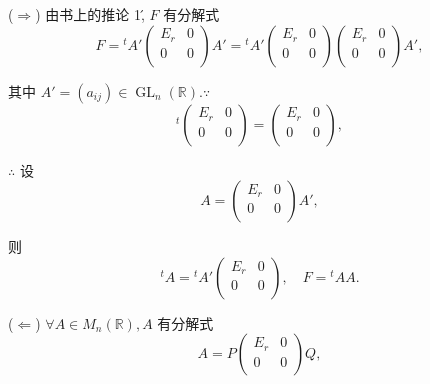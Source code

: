 \documentclass{ctexart}
\begin{document}
\begin{solution}
    ($\Rightarrow$) 由书上的推论 1\', $F$ 有分解式
    \[F={}^tA'\begin{pmatrix}
        E_r & 0 \\
        0 & 0 \\
    \end{pmatrix}A'={}^tA'\begin{pmatrix}
        E_r & 0 \\
        0 & 0 \\
    \end{pmatrix}\begin{pmatrix}
        E_r & 0 \\
        0 & 0 \\
    \end{pmatrix}A',\]

    其中 $A'=(a_{ij})\in\operatorname{GL}_n(\mathbb{R}).\because$
    \[{}^t\begin{pmatrix}
        E_r & 0 \\
        0 & 0 \\
    \end{pmatrix}=\begin{pmatrix}
        E_r & 0 \\
        0 & 0 \\
    \end{pmatrix},\]

    $\therefore$ 设
    \[A=\begin{pmatrix}
        E_r & 0 \\
        0 & 0 \\
    \end{pmatrix}A',\]

    则
    \[{}^tA={}^tA'\begin{pmatrix}
        E_r & 0 \\
        0 & 0 \\
    \end{pmatrix},\quad F={}^tAA.\]

    ($\Leftarrow$) $\forall A\in M_n(\mathbb{R}),A$ 有分解式
    \[A=P\begin{pmatrix}
        E_r & 0 \\
        0 & 0 \\
    \end{pmatrix}Q,\]


\end{solution}
\end{document}
